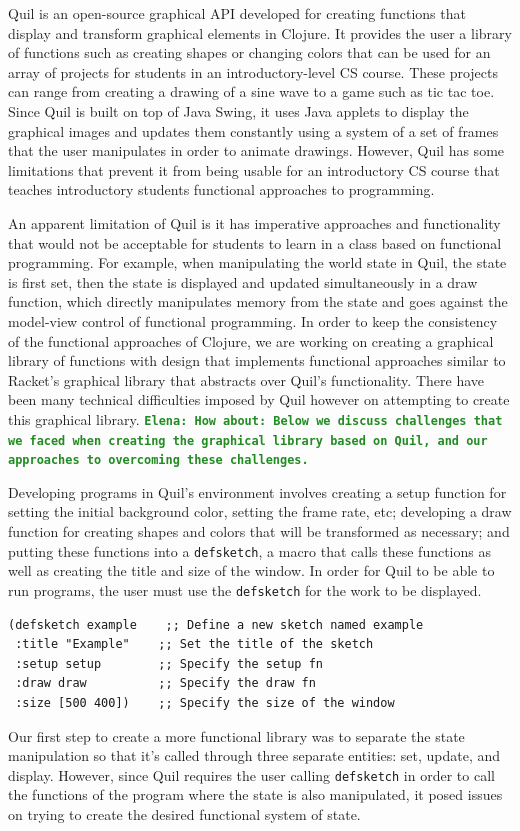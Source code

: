 \documentclass[12pt]{article}
\newcommand{\comment}[1]{{\bf \tt  {#1}}}
\newcommand{\emcomment}[1]{\textcolor{ForestGreen}{\comment{Elena: {#1}}}}
\begin{document}
Quil is an open-source graphical API developed for creating functions that display and transform graphical elements in Clojure. It provides the user a library of functions such as creating shapes or changing colors that can be used for an array of projects for students in an introductory-level CS course. These projects can range from creating a drawing of a sine wave to a game such as tic tac toe. Since Quil is built on top of Java Swing, it uses Java applets to display the graphical images and updates them constantly using a system of a set of frames that the user manipulates in order to animate drawings. However, Quil has some limitations that prevent it from being usable for an introductory CS course that teaches introductory students functional approaches to programming.

An apparent limitation of Quil is it has imperative approaches and functionality that would not be acceptable for students to learn in a class based on functional programming. For example, when manipulating the world state in Quil, the state is first set, then the state is displayed and updated simultaneously in a draw function, which directly manipulates memory from the state and goes against the model-view control of functional programming. In order to keep the consistency of the functional approaches of Clojure, we are working on creating a graphical library of functions with design that implements functional approaches similar to Racket’s graphical library that abstracts over Quil’s functionality. There have been many technical difficulties imposed by Quil however on attempting to create this graphical library.
\emcomment{How about: Below we discuss challenges that we faced when creating the graphical library based on Quil, and our approaches to overcoming these challenges.}

Developing programs in Quil’s environment involves creating a setup function for setting the initial background color, setting the frame rate, etc; developing a draw function for creating shapes and colors that will be transformed as necessary; and putting these functions into a \texttt{defsketch}, a macro that calls these functions as well as creating the title and size of the window. In order for Quil to be able to run programs, the user must use the \texttt{defsketch} for the work to be displayed.
\begin{verbatim}
(defsketch example    ;; Define a new sketch named example
 :title "Example"    ;; Set the title of the sketch
 :setup setup        ;; Specify the setup fn
 :draw draw          ;; Specify the draw fn
 :size [500 400])    ;; Specify the size of the window
\end{verbatim}
Our first step to create a more functional library was to separate the state manipulation so that it’s called through three separate entities: set, update, and display. However, since Quil requires the user calling \texttt{defsketch} in order to call the functions of the program where the state is also manipulated, it posed issues on trying to create the desired functional system of state. 
\end{document}

